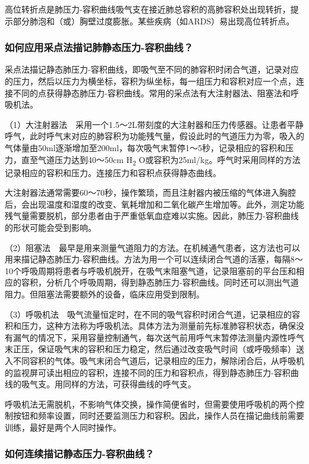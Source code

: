 高位转折点是肺压力-容积曲线吸气支在接近肺总容积的高肺容积处出现转折，提示部分肺泡和（或）胸壁过度膨胀。某些疾病（如ARDS）易出现高位转折点。

\subsubsection{如何应用采点法描记肺静态压力-容积曲线？}

采点法描记静态肺压力-容积曲线，即吸气至不同的肺容积时闭合气道，记录对应的压力，然后以压力为横坐标，容积为纵坐标，每一组压力和容积对应一个点，连接不同的点获得静态肺压力-容积曲线。常用的采点法有大注射器法、阻塞法和呼吸机法。

（1）大注射器法　采用一个1.5～2L带刻度的大注射器和压力传感器。让患者平静呼气，此时呼气末对应的肺容积为功能残气量，假设此时的气道压力为零，吸入的气体量由50ml逐渐增加至200ml，每次吸气末暂停1～5秒，记录相应的容积和压力，直至气道压力达到40～50cm
H\textsubscript{2}
O或容积为25ml/kg。呼气时采用同样的方法记录相应的容积和压力。连接压力和容积点获得静态曲线。

大注射器法通常需要60～70秒，操作繁琐，而且注射器内被压缩的气体进入胸腔后，会出现温度和湿度的改变、氧耗增加和二氧化碳产生增加等。此外，测定功能残气量需要脱机，部分患者由于严重低氧血症难以实施。因此，肺压力-容积曲线的形状可能会受到影响。

（2）阻塞法　最早是用来测量气道阻力的方法。在机械通气患者，这方法也可以用来描记静态肺压力-容积曲线。方法为用一个可以连续闭合气道的活塞，每隔8～10个呼吸周期将患者与呼吸机脱开，在吸气末阻塞气道，记录阻塞前的平台压和相应的容积，分析几个呼吸周期，得到静态肺压力-容积曲线。同时还可以测出气道阻力。但阻塞法需要额外的设备，临床应用受到限制。

（3）呼吸机法　吸气流量恒定时，在不同的吸气容积时闭合气道，记录相应的容积和压力，这种方法称为呼吸机法。具体方法为测量前先标准肺容积状态，确保没有漏气的情况下，采用容量控制通气，每次送气前用呼气末暂停法测量内源性呼气末正压，保证吸气末的容积和压力稳定，然后通过改变吸气时间（或呼吸频率）送入不同容积的气体。吸气末闭合气道后，记录相应的压力，解除闭合后，从呼吸机的监视屏可读出相应的容积，连接不同的压力和容积点，得到静态肺压力-容积曲线的吸气支。用同样的方法，可获得曲线的呼气支。

呼吸机法无需脱机，不影响气体交换，操作简便省时，但需要使用呼吸机的两个控制按钮和频率设置，同时还要监测压力和容积。因此，操作人员在描记曲线前需要训练，最好是两个人同时操作。

\subsubsection{如何连续描记静态压力-容积曲线？}

